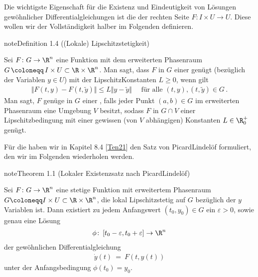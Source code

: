 \documentclass[letterpaper,10pt,english]{jupyterBook}
\begin{document}
\sphinxAtStartPar
Die wichtigste Eigenschaft für die Existenz und Eindeutigkeit von Lösungen gewöhnlicher Differentialgleichungen ist die  der rechten Seite \(F \colon I \times U \rightarrow U\).
Diese wollen wir der Vollständigkeit halber im Folgenden definieren.
\label{ode/repetition:definition-8}
\begin{sphinxadmonition}{note}{Definition 1.4 ((Lokale) Lipschitzstetigkeit)}



\sphinxAtStartPar
Sei \(F \colon G \to \R^n\) eine Funktion mit dem erweiterten Phasenraum \(G \, \coloneqq \, I \times U \subset \R\times\R^n\).
Man sagt, dass \(F\) in \(G\) einer  genügt (bezüglich der Variablen \(y \in U\)) mit der Lipschitz\sphinxhyphen{}Konstanten \(L\geq0\), wenn gilt
\begin{equation*}
\begin{split}\Vert F(t,y) - F(t,\widetilde{y}) \Vert \leq L \Vert y-\widetilde{y}\Vert\quad\text{ für alle }(t,y), (t,\widetilde{y})\in G\,.\end{split}
\end{equation*}
\sphinxAtStartPar
Man sagt, \(F\) genüge in \(G\) einer , falls jeder Punkt \((a,b)\in G\) im erweiterten Phasenraum eine Umgebung \(V\) besitzt, sodass \(F\) in \(G\cap V\) einer Lipschitzbedingung mit einer gewissen (von \(V\) abhängigen) Konstanten \(L\in\R_0^+\) genügt.
\end{sphinxadmonition}

\sphinxAtStartPar
Für die  haben wir in Kapitel 8.4 {[}\hyperlink{cite.references:id12}{Ten21}{]} den Satz von Picard\sphinxhyphen{}Lindelöf formuliert, den wir im Folgenden wiederholen werden.
\label{ode/repetition:satz:picardlindeloef_lokal}
\begin{sphinxadmonition}{note}{Theorem 1.1 (Lokaler Existenzsatz nach Picard\sphinxhyphen{}Lindelöf)}



\sphinxAtStartPar
Sei \(F\colon G\to\R^n\) eine stetige Funktion mit erweitertem Phasenraum \(G \coloneqq I \times U \subset \R\times\R^n\), die lokal Lipschitz\sphinxhyphen{}stetig auf \(G\) bezüglich der \(y\)\sphinxhyphen{}Variablen ist.
Dann existiert zu jedem Anfangswert \((t_0,y_0) \in G\) ein \(\varepsilon>0\), sowie genau eine Lösung
\begin{equation*}
\begin{split}\phi \colon \left[t_0-\varepsilon, t_0+\varepsilon\right] \to \R^n\end{split}
\end{equation*}
\sphinxAtStartPar
der gewöhnlichen Differentialgleichung
\begin{equation*}
\begin{split}\dot{y}(t) \ = \ F(t,y(t))\end{split}
\end{equation*}
\sphinxAtStartPar
unter der Anfangsbedingung \(\phi(t_0)=y_0\).
\end{sphinxadmonition}
\end{document}
